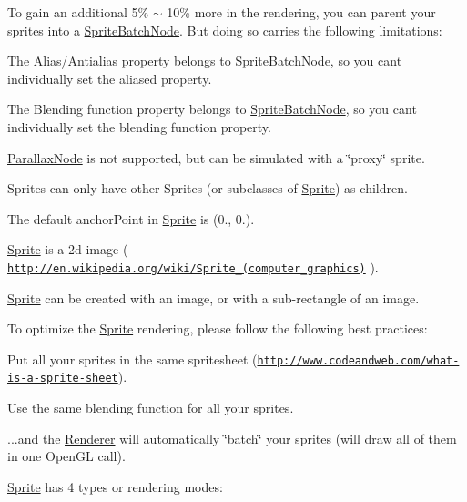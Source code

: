 To gain an additional 5\% $\sim$ 10\% more in the rendering, you can parent your sprites into a {\ttfamily \hyperlink{classSpriteBatchNode}{Sprite\+Batch\+Node}}. But doing so carries the following limitations\+:


\begin{DoxyItemize}
\item The Alias/\+Antialias property belongs to {\ttfamily \hyperlink{classSpriteBatchNode}{Sprite\+Batch\+Node}}, so you can\textquotesingle{}t individually set the aliased property.
\item The Blending function property belongs to {\ttfamily \hyperlink{classSpriteBatchNode}{Sprite\+Batch\+Node}}, so you can\textquotesingle{}t individually set the blending function property.
\item {\ttfamily \hyperlink{classParallaxNode}{Parallax\+Node}} is not supported, but can be simulated with a \char`\"{}proxy\char`\"{} sprite.
\item Sprites can only have other Sprites (or subclasses of \hyperlink{classSprite}{Sprite}) as children.
\end{DoxyItemize}

The default anchor\+Point in \hyperlink{classSprite}{Sprite} is (0., 0.).

\hyperlink{classSprite}{Sprite} is a 2d image ( \href{http://en.wikipedia.org/wiki/Sprite_(computer_graphics)}{\tt http\+://en.\+wikipedia.\+org/wiki/\+Sprite\+\_\+(computer\+\_\+graphics)} ).

\hyperlink{classSprite}{Sprite} can be created with an image, or with a sub-\/rectangle of an image.

To optimize the \hyperlink{classSprite}{Sprite} rendering, please follow the following best practices\+:
\begin{DoxyItemize}
\item Put all your sprites in the same spritesheet (\href{http://www.codeandweb.com/what-is-a-sprite-sheet}{\tt http\+://www.\+codeandweb.\+com/what-\/is-\/a-\/sprite-\/sheet}).
\item Use the same blending function for all your sprites.
\item ...and the \hyperlink{classRenderer}{Renderer} will automatically \char`\"{}batch\char`\"{} your sprites (will draw all of them in one Open\+GL call).
\end{DoxyItemize}

\hyperlink{classSprite}{Sprite} has 4 types or rendering modes\+:


